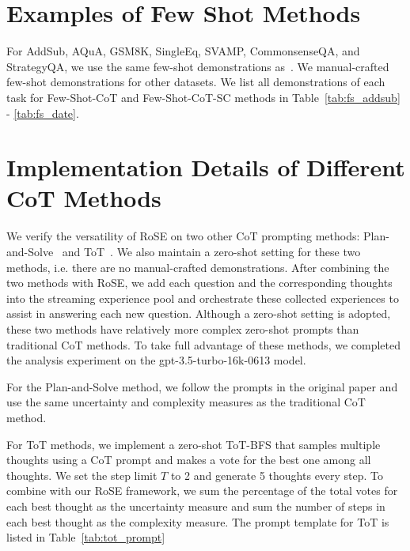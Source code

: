 \documentclass[11pt]{article}
\begin{document}
\section{Examples of Few Shot Methods}
\label{sec:prompt_fs}
For AddSub, AQuA, GSM8K, SingleEq, SVAMP, CommonsenseQA, and StrategyQA, we use the same few-shot demonstrations as~\citet{wei2022cot}. We manual-crafted few-shot demonstrations for other datasets. We list all demonstrations of each task for Few-Shot-CoT and Few-Shot-CoT-SC methods in Table~\ref{tab:fs_addsub} - \ref{tab:fs_date}.

\section{Implementation Details of Different CoT Methods}
\label{sec:setting_cot}
We verify the versatility of RoSE on two other CoT prompting methods: Plan-and-Solve~\cite{wang2023psp} and ToT~\cite{yao2023tot}. We also maintain a zero-shot setting for these two methods, i.e. there are no manual-crafted demonstrations. After combining the two methods with RoSE, we add each question and the corresponding thoughts into the streaming experience pool and orchestrate these collected experiences to assist in answering each new question. Although a zero-shot setting is adopted, these two methods have relatively more complex zero-shot prompts than traditional CoT methods. To take full advantage of these methods, we completed the analysis experiment on the gpt-3.5-turbo-16k-0613 model. 

For the Plan-and-Solve method, we follow the prompts in the original paper and use the same uncertainty and complexity measures as the traditional CoT method.

For ToT methods, we implement a zero-shot ToT-BFS that samples multiple thoughts using a CoT prompt and makes a vote for the best one among all thoughts. We set the step limit $T$ to 2 and generate 5 thoughts every step. To combine with our RoSE framework, we sum the percentage of the total votes for each best thought as the uncertainty measure and sum the number of steps in each best thought as the complexity measure. The prompt template for ToT is listed in Table~\ref{tab:tot_prompt}
\end{document}
